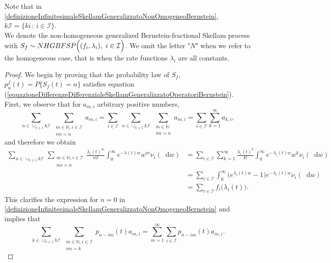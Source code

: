 \documentclass[12pt, twoside, english, headsepline]{article}
\newcommand*\dif{\mathop{}\!\mathrm{d}}  %
\theoremstyle{definition} %
\numberwithin{equation}{section} %
\begin{document}
Note that in \eqref{definizioneInfinitesimaleSkellamGeneralizzatoNonOmogeneoBernstein}, $k\mathcal{I} = \{ki\,:\, i\in\mathcal{I}\}$.
\\We denote the non-homogeneous generalized Bernstein-fractional Skellam process with $S_f\sim NHGBFSP\Bigl((f_i,\lambda_i),\ i\in\mathcal{I}\Bigr)$. We omit the letter "$N$" when we refer to the homogeneous case, that is when the rate functions $\lambda_i$ are all constants.

\begin{proof}
We begin by proving that the probability law of $S_f$, $p^f_n(t) = P\{S_f(t) = n\}$ satisfies equation (\ref{equazioneDifferenzeDifferenzialeSkellamGeneralizzatoOperatoriBernstein}).
First, we observe that for $a_{m,i}$ arbitrary positive numbers,
$$ \sum_{n\in\cup_{k\ge1}k\mathcal{I}}\  \sum_{\substack{m\in\mathbb{N}, i\in\mathcal{I}\\im = n}} a_{m, i}= \sum_{ i\in\mathcal{I}}\  \sum_{n\in\cup_{k\ge1}k\mathcal{I}} \ \sum_{\substack{m\in\mathbb{N}\\im = n}} a_{m, i} =  \sum_{ i\in\mathcal{I}} \sum_{k=1}^\infty  a_{k,i},$$
and therefore we obtain
\begin{align*}
\sum_{n\in\cup_{k\ge1}k\mathcal{I}}\, \sum_{\substack{m\in\mathbb{N}, i\in\mathcal{I}\\mi = n}}  \frac{\lambda_i(t)^m}{m!} \int_0^\infty e^{-\lambda(t) w} w^m\nu_i(\dif w)&= \sum_{i\in\mathcal{I}} \sum_{k=1}^\infty \frac{\lambda_i(t)^k}{k!} \int_0^\infty e^{-\lambda_i(t) w} w^k\nu_i(\dif w)\\
& = \sum_{i\in\mathcal{I}} \int_0^\infty \Big(e^{\lambda_i(t)w}-1\Big) e^{-\lambda_i(t) w} \nu_i(\dif w) \\
& =\sum_{i\in\mathcal{I}} f_i\Big(\lambda_i(t)\Big).
\end{align*}
This clarifies the expression for $n=0$ in \eqref{definizioneInfinitesimaleSkellamGeneralizzatoNonOmogeneoBernstein} and  implies that
\begin{equation}\label{SkellamBernsteinFormulaAiuto}
\sum_{k\in\cup_{h\ge1}h\mathcal{I}}\  \sum_{\substack{m\in\mathbb{N}, i\in\mathcal{I}\\im = k}} p_{n-im}(t) a_{m, i}=  \sum_{m=1}^\infty \sum_{ i\in\mathcal{I}} p_{n-im}(t) a_{m,i}.
\end{equation}


\end{proof}
\end{document}
